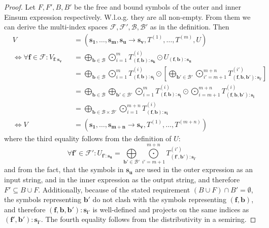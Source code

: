 \bigskip
\begin{proof}
    \small
    Let $F, F', B, B'$ be the free and bound symbols of the outer and inner Einsum expression respectively.
    W.l.o.g. they are all non-empty.
    From them we can derive the multi-index spaces $\mathcal{F}, \mathcal{F}', \mathcal{B}, \mathcal{B}'$ as in the definition.
    Then
    \begin{align*}
         & V                                                         &  & = (\bm{s_1},\dots,\bm{s_m}, \bm{s_u} \rightarrow \bm{s_v}, T^{(1)},\dots,T^{(m)}, U)                                                                                                                                                                             \\
         & \iff \forall \bm{f} \in \mathcal{F}: V_{\bm{f}: \bm{s_v}} &  & = \bigoplus\limits_{\bm{b} \in \mathcal{B}} \bigodot\limits_{i = 1}^{m} T^{(i)}_{(\bm{f}, \bm{b}):\bm{s_k}} \odot U_{(\bm{f}, \bm{b}):\bm{s_u}}                                                                                                                  \\
         &                                                           &  & = \bigoplus\limits_{\bm{b} \in \mathcal{B}} \bigodot\limits_{i = 1}^{m} T^{(i)}_{(\bm{f}, \bm{b}):\bm{s_i}} \odot \left[\bigoplus\limits_{\bm{b'} \in \mathcal{B}'} \bigodot\limits_{i' = m + 1}^{m + n} T^{(i')}_{(\bm{f}, \bm{b}, \bm{b'}):\bm{s_{i'}}}\right] \\
         &                                                           &  & = \bigoplus\limits_{\bm{b} \in \mathcal{B}} \bigoplus\limits_{\bm{b'} \in \mathcal{B}'} \bigodot\limits_{i = 1}^{m} T^{(i)}_{(\bm{f}, \bm{b}):\bm{s_i}} \odot \bigodot\limits_{i = m + 1}^{m + n} T^{(i)}_{(\bm{f}, \bm{b}, \bm{b'}):\bm{s_{i}}}                 \\
         &                                                           &  & = \bigoplus\limits_{\bm{b} \in \mathcal{B} \times \mathcal{B}'} \bigodot\limits_{i = 1}^{m + n} T^{(i)}_{(\bm{f}, \bm{b}):\bm{s_i}}                                                                                                                              \\
         & \iff V                                                    &  & = (\bm{s_1}, \dots, \bm{s_{m + n}} \rightarrow \bm{s_v}, T^{(1)}, \dots, T^{(m + n)})
    \end{align*}
    where the third equality follows from the definition of $U$:
    $$\forall \bm{f'} \in \mathcal{F}': U_{\bm{f'}: \bm{s_u}} = \bigoplus\limits_{\bm{b'} \in \mathcal{B}'} \bigodot\limits_{i' = m + 1}^{m + n} T^{(i')}_{(\bm{f'}, \bm{b'}):\bm{s_{i'}}}$$
    and from the fact, that the symbols in $\bm{s_u}$ are used in the outer expression as an input string, and in the inner expression as the output string, and therefore $F' \subseteq B \cup F$.
    Additionally, because of the stated requirement $(B \cup F) \cap B' = \emptyset$, the symbols representing $\bm{b'}$ do not clash with the symbols representing $(\bm{f}, \bm{b})$, and therefore $(\bm{f}, \bm{b}, \bm{b'}):\bm{s_{i'}}$ is well-defined and projects on the same indices as $(\bm{f'}, \bm{b'}):\bm{s_{i'}}$.
    The fourth equality follows from the distributivity in a semiring.
\end{proof}
\bigskip